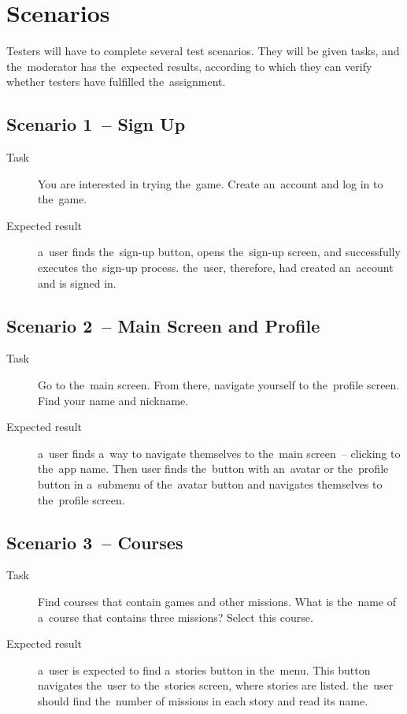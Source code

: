 \section{Scenarios}

Testers will have to complete several test scenarios.
They will be given tasks, and the~moderator has the~expected results, according to which they can verify whether testers have fulfilled the~assignment.

\subsection*{Scenario 1~-- Sign Up}

\begin{description}
    \item[Task] You are interested in trying the~game.
    Create an~account and log in to the~game.
    \item[Expected result] a~user finds the~sign-up button, opens the~sign-up screen, and successfully executes the~sign-up process.
    the~user, therefore, had created an~account and is signed in.
\end{description}

\subsection*{Scenario 2~-- Main Screen and Profile}

\begin{description}
    \item[Task] Go to the~main screen.
    From there, navigate yourself to the~profile screen.
    Find your name and nickname.
    \item[Expected result] a~user finds a~way to navigate themselves to the~main screen~-- clicking to the~app name.
    Then user finds the~button with an~avatar or the~profile button in a~submenu of the~avatar button and navigates themselves to the~profile screen.
\end{description}

\subsection*{Scenario 3~-- Courses}

\begin{description}
    \item[Task] Find courses that contain games and other missions.
    What is the~name of a~course that contains three missions?
    Select this course.
    \item[Expected result] a~user is expected to find a~stories button in the~menu.
    This button navigates the~user to the~stories screen, where stories are listed.
    the~user should find the~number of missions in each story and read its name.
\end{description}


